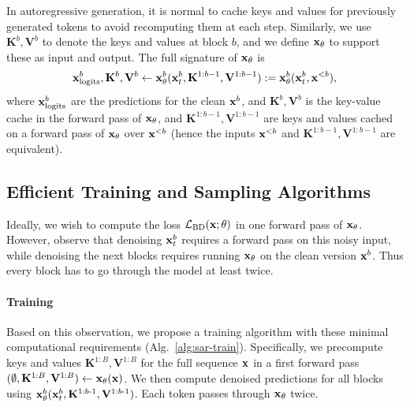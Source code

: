 \documentclass{article} %
\begin{document}
In autoregressive generation, it is normal to cache keys and values for previously generated tokens to avoid recomputing them at each step. Similarly, we use $\mathbf{K}^b, \mathbf{V}^b$ to denote the keys and values at block $b$, and we define ${\mathbf x}_\theta$ to support these as input and output. The full signature of ${\mathbf x}_\theta$ is
\begin{align}\label{eqn:model-kv}
    {\mathbf x}_\text{logits}^b, \mathbf{K}^b, \mathbf{V}^b \gets {\mathbf x}^b_\theta({\mathbf x}^b_t, \mathbf{K}^{1:b-1}, \mathbf{V}^{1:b-1}) := {\mathbf x}^b_\theta({\mathbf x}^b_t, {\mathbf x}^{<b}),
\end{align}
where ${\mathbf x}_\text{logits}^b$ are the predictions for the clean ${\mathbf x}^b$, and $\mathbf{K}^b, \mathbf{V}^b$ is the key-value cache in the forward pass of ${\mathbf x}_\theta$, and $\mathbf{K}^{1:b-1}, \mathbf{V}^{1:b-1}$ are keys and values cached on a forward pass of ${\mathbf x}_\theta$ over ${\mathbf x}^{<b}$ (hence the inputs ${\mathbf x}^{<b}$ and $\mathbf{K}^{1:b-1}, \mathbf{V}^{1:b-1}$ are equivalent). 



\subsection{Efficient Training and Sampling Algorithms}\label{sec:eff-algs}

Ideally, we wish to compute the loss $\mathcal{L}_\text{BD}({\mathbf x}; \theta)$ in one forward pass of ${\mathbf x}_\theta$. However, observe that denoising ${\mathbf x}_t^b$ requires a forward pass on this noisy input, while denoising the next blocks requires running ${\mathbf x}_\theta$ on the clean version ${\mathbf x}^b$. Thus every block has to go through the model at least twice.

\paragraph{Training}
Based on this observation, we propose a training algorithm with these minimal computational requirements
%
(Alg.~\ref{alg:sar-train}). Specifically, we precompute keys and values $\mathbf{K}^{1:B}, \mathbf{V}^{1:B}$ for the full sequence ${\mathbf x}$ in a first forward pass $(\emptyset, \mathbf{K}^{1:B}, \mathbf{V}^{1:B}) \gets {\mathbf x}_\theta({\mathbf x})$.
We then compute denoised predictions for all blocks using ${\mathbf x}_\theta^b({\mathbf x}_{t}^b,  \mathbf{K}^{1:b\text{-}1}, \mathbf{V}^{1:b\text{-}1})$. Each token passes through ${\mathbf x}_\theta$ twice.
\end{document}
